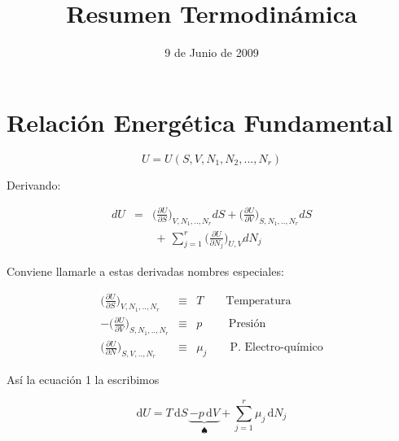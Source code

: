 \documentclass[10pt,twocolumn]{IEEEtran2e}
\title{Resumen Termodin\'amica}
\author{9 de Junio de 2009}
\newcommand{\ud}{\mathrm{d}}
\begin{document}
\maketitle


\section{Relaci\'on Energ\'etica Fundamental}
\begin{equation}
 U=U(S,V,N_{1},N_{2},...,N_{r})
\end{equation}

Derivando:

\begin{eqnarray}
 dU & = & \bigg(\frac{\partial U}{\partial S}\bigg)_{V,N_{1},..,N_{r}} dS + \bigg(\frac{\partial U}{\partial V}\bigg)_{S,N_{1},..,N_{r}} dS \nonumber\\
    &  &  \, + \, \sum_{j=1}^{r} \bigg(\frac{\partial U}{\partial N_{j}}\bigg)_{U,V} dN_{j}
\end{eqnarray}


Conviene llamarle a estas derivadas nombres especiales:

\begin{eqnarray}
\bigg(\frac{\partial U}{\partial S}\bigg)_{V,N_{1},..,N_{r}} & \equiv & T \qquad \textrm{Temperatura}\\
- \bigg(\frac{\partial U}{\partial V}\bigg)_{S,N_{1},..,N_{r}} & \equiv & p \qquad \textrm{ Presi\'on}\\
\bigg(\frac{\partial U}{\partial N}\bigg)_{S,V,..,N_{r}}     & \equiv & \mu_{j} \qquad \textrm{P. Electro-qu\'imico}
\end{eqnarray}

As\'i la ecuaci\'on 1 la escribimos

\begin{equation}
 \ud U = T \, \ud S \, \underbrace{- p \, \ud V}_{\spadesuit} + \sum_{j=1}^{r}\mu_{j} \, \ud N_{j}
\end{equation}
\end{document}
